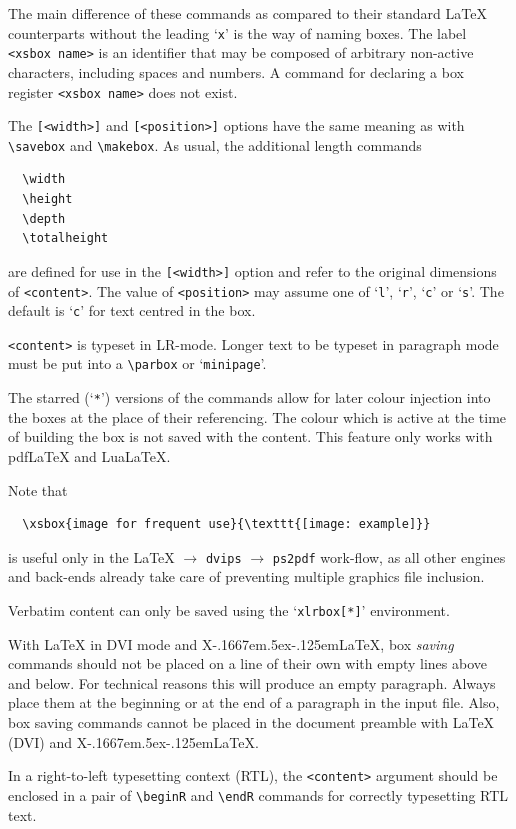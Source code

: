 \documentclass[a4paper]{article}
\def\XeLaTeX{X\kern-.1667em\lower.5ex\hbox{\reflectbox{E}}\kern-.125em\LaTeX}
\begin{document}
The main difference of these commands as compared to their standard \LaTeX{} counterparts without the leading `\verb+x+' is the way of naming boxes. The label \verb+<xsbox name>+ is an identifier that may be composed of arbitrary non-active characters, including spaces and numbers. A command for declaring a box register \verb+<xsbox name>+ does not exist.

The \verb+[<width>]+ and \verb+[<position>]+ options have the same meaning as with \verb+\savebox+ and \verb+\makebox+. As usual, the additional length commands
\begin{Verbatim}
  \width
  \height
  \depth
  \totalheight
\end{Verbatim}
are defined for use in the \verb+[<width>]+ option and refer to the original dimensions of \verb+<content>+. The value of \verb+<position>+ may assume one of `\verb+l+', `\verb+r+', `\verb+c+' or `\verb+s+'. The default is `\verb+c+' for text centred in the box.

\verb+<content>+ is typeset in LR-mode. Longer text to be typeset in paragraph mode must be put into a \verb+\parbox+ or `\verb+minipage+'.

The starred (`\verb+*+') versions of the commands allow for later colour injection into the boxes at the place of their referencing. The colour which is active at the time of building the box is not saved with the content. This feature only works with pdf\LaTeX{} and Lua\LaTeX.

Note that
\begin{Verbatim}
  \xsbox{image for frequent use}{\texttt{[image: example]}}  
\end{Verbatim}
is useful only in the \LaTeX{} $\rightarrow$ \verb+dvips+ $\rightarrow$ \verb+ps2pdf+ work-flow, as all other engines and back-ends already take care of preventing multiple graphics file inclusion.

Verbatim content can only be saved using the `\verb+xlrbox[*]+' environment.

With \LaTeX{} in DVI mode and \XeLaTeX, box \emph{saving} commands should not be placed on a line of their own with empty lines above and below. For technical reasons this will produce an empty paragraph. Always place them at the beginning or at the end of a paragraph in the input file. Also, box saving commands cannot be placed in the document preamble with \LaTeX{} (DVI) and \XeLaTeX{}.

In a right-to-left typesetting context (RTL), the \verb+<content>+ argument should be enclosed in a pair of \verb+\beginR+ and \verb+\endR+ commands for correctly typesetting RTL text.
\end{document}
